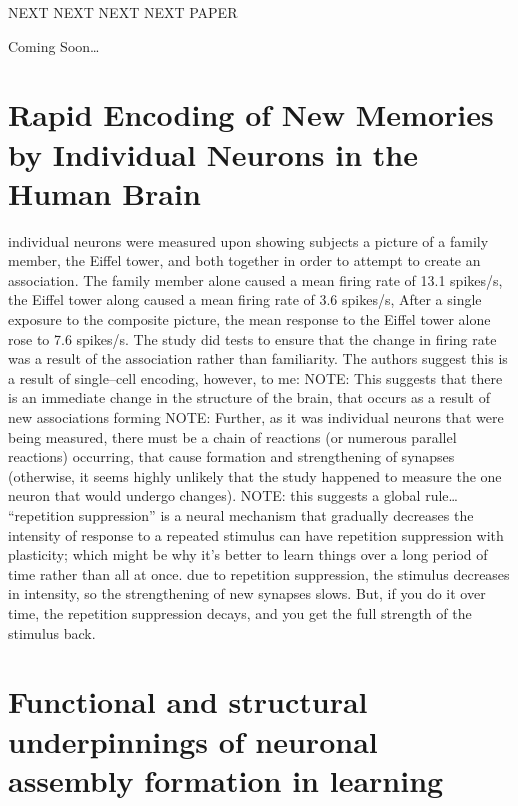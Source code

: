 \documentclass[11pt, a4paper, oneside]{article}   	%
\begin{document}
NEXT NEXT NEXT NEXT PAPER

Coming Soon\ldots


\section{Rapid Encoding of New Memories by Individual Neurons in the Human Brain \cite{Ison2015}}

\begin{outline}
    \point individual neurons were measured upon showing subjects a picture of a family member, the Eiffel tower, and both together in order to attempt to create an association. The family member alone caused a mean firing rate of 13.1 spikes/s, the Eiffel tower along caused a mean firing rate of 3.6 spikes/s, After a single exposure to the composite picture, the mean response to the Eiffel tower alone rose to 7.6 spikes/s. The study did tests to ensure that the change in firing rate was a result of the association rather than familiarity.  
    \point The authors suggest this is a result of single--cell encoding, however, to me:
        \subpoint NOTE: This suggests that there is an immediate change in the structure of the brain, that occurs as a result of new associations forming
        \subpoint NOTE: Further, as it was individual neurons that were being measured, there must be a chain of reactions (or numerous parallel reactions) occurring, that cause formation and strengthening of synapses (otherwise, it seems highly unlikely that the study happened to measure the one neuron that would undergo changes).
            \subsubpoint NOTE: this suggests a global rule\ldots
\point ``repetition suppression'' is a neural mechanism that gradually decreases the intensity of response to a repeated stimulus
    \subpoint can have repetition suppression with plasticity; which might be why it's better to learn things over a long period of time rather than all at once. due to repetition suppression, the stimulus decreases in intensity, so the strengthening of new synapses slows. But, if you do it over time, the repetition suppression decays, and you get the full strength of the stimulus back.
\end{outline}


\section{Functional and structural underpinnings of neuronal assembly formation in learning \cite{Holtmaat2016}}
\end{document}
